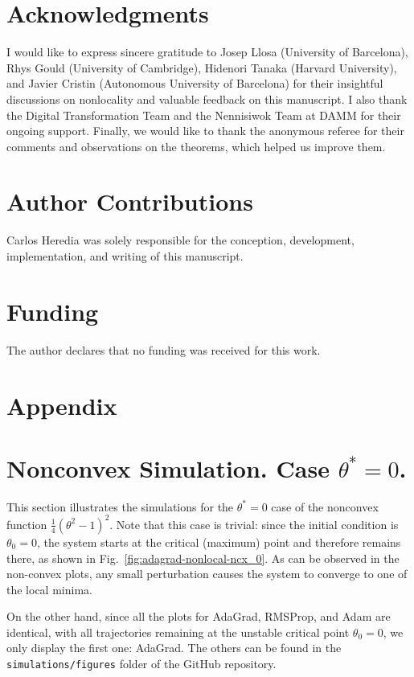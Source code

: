 \documentclass{article} %
\begin{document}
\section*{Acknowledgments}
I would like to express sincere gratitude to Josep Llosa (University of Barcelona), Rhys Gould (University of Cambridge), Hidenori Tanaka (Harvard University), and Javier Cristin (Autonomous University of Barcelona) for their insightful discussions on nonlocality and valuable feedback on this manuscript. I also thank the Digital Transformation Team and the Nennisiwok Team at DAMM for their ongoing support. Finally, we would like to thank the anonymous referee for their comments and observations on the theorems, which helped us improve them.

\section*{Author Contributions}
Carlos Heredia was solely responsible for the conception, development, implementation, and writing of this manuscript.

\section*{Funding}
The author declares that no funding was received for this work.

\appendix

\section*{Appendix}

\section{Nonconvex Simulation. Case $\theta^*=0$.}\label{Appendix}
This section illustrates the simulations for the \(\theta^*=0\) case of the nonconvex function \(\tfrac{1}{4}(\theta^2-1)^2\). Note that this case is trivial: since the initial condition is \(\theta_0 = 0\), the system starts at the critical (maximum) point and therefore remains there, as shown in Fig.~\ref{fig:adagrad-nonlocal-ncx_0}. As can be observed in the non-convex plots, any small perturbation causes the system to converge to one of the local minima.

On the other hand, since all the plots for AdaGrad, RMSProp, and Adam are identical, with all trajectories remaining at the unstable critical point \(\theta_0=0\), we only display the first one: AdaGrad. The others can be found in the \texttt{simulations/figures} folder of the GitHub repository.
\end{document}
